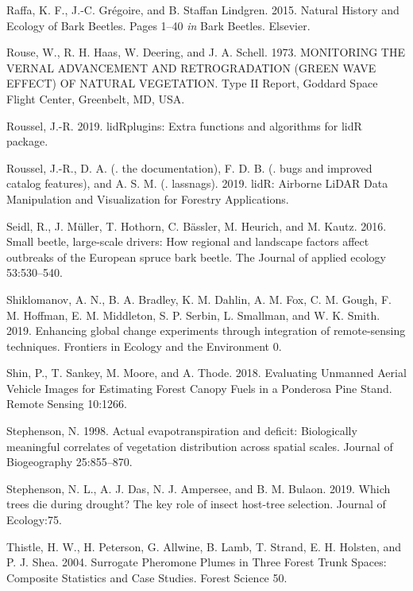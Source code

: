 \documentclass[]{article}
\begin{document}
\hypertarget{ref-raffa2015}{}
Raffa, K. F., J.-C. Grégoire, and B. Staffan Lindgren. 2015. Natural
History and Ecology of Bark Beetles. Pages 1--40 \emph{in} Bark Beetles.
Elsevier.

\hypertarget{ref-rouse1973}{}
Rouse, W., R. H. Haas, W. Deering, and J. A. Schell. 1973. MONITORING
THE VERNAL ADVANCEMENT AND RETROGRADATION (GREEN WAVE EFFECT) OF NATURAL
VEGETATION. Type II Report, Goddard Space Flight Center, Greenbelt, MD,
USA.

\hypertarget{ref-roussel2019a}{}
Roussel, J.-R. 2019. lidRplugins: Extra functions and algorithms for
lidR package.

\hypertarget{ref-roussel2019}{}
Roussel, J.-R., D. A. (. the documentation), F. D. B. (. bugs and
improved catalog features), and A. S. M. (. lassnags). 2019. lidR:
Airborne LiDAR Data Manipulation and Visualization for Forestry
Applications.

\hypertarget{ref-seidl2016a}{}
Seidl, R., J. Müller, T. Hothorn, C. Bässler, M. Heurich, and M. Kautz.
2016. Small beetle, large-scale drivers: How regional and landscape
factors affect outbreaks of the European spruce bark beetle. The Journal
of applied ecology 53:530--540.

\hypertarget{ref-shiklomanov2019}{}
Shiklomanov, A. N., B. A. Bradley, K. M. Dahlin, A. M. Fox, C. M. Gough,
F. M. Hoffman, E. M. Middleton, S. P. Serbin, L. Smallman, and W. K.
Smith. 2019. Enhancing global change experiments through integration of
remote-sensing techniques. Frontiers in Ecology and the Environment 0.

\hypertarget{ref-shin2018}{}
Shin, P., T. Sankey, M. Moore, and A. Thode. 2018. Evaluating Unmanned
Aerial Vehicle Images for Estimating Forest Canopy Fuels in a Ponderosa
Pine Stand. Remote Sensing 10:1266.

\hypertarget{ref-stephenson1998}{}
Stephenson, N. 1998. Actual evapotranspiration and deficit: Biologically
meaningful correlates of vegetation distribution across spatial scales.
Journal of Biogeography 25:855--870.

\hypertarget{ref-stephenson2019}{}
Stephenson, N. L., A. J. Das, N. J. Ampersee, and B. M. Bulaon. 2019.
Which trees die during drought? The key role of insect host-tree
selection. Journal of Ecology:75.

\hypertarget{ref-thistle2004}{}
Thistle, H. W., H. Peterson, G. Allwine, B. Lamb, T. Strand, E. H.
Holsten, and P. J. Shea. 2004. Surrogate Pheromone Plumes in Three
Forest Trunk Spaces: Composite Statistics and Case Studies. Forest
Science 50.
\end{document}
